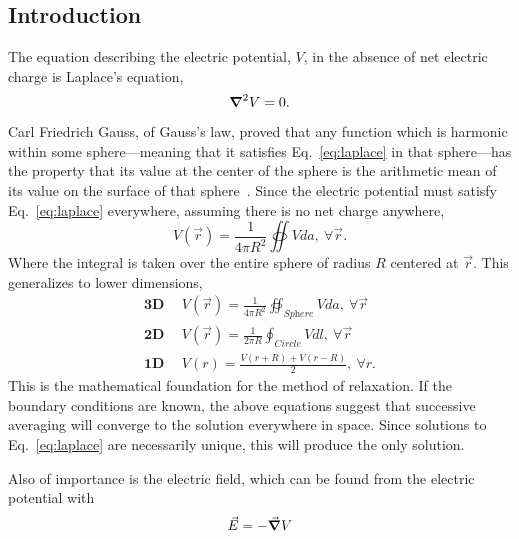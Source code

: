 \documentclass[12pt,twocolumn]{article}
\begin{document}
\subsection{Introduction}
The equation describing the electric potential, $V$, in the absence of net electric charge is Laplace's equation\cite{Jackson99},
\begin{equation}
\grad^2V=0.
\label{eq:laplace}
\end{equation}
Carl Friedrich Gauss, of Gauss's law, proved that any function which is harmonic within some sphere---meaning that it satisfies Eq.~\ref{eq:laplace} in that sphere---has the property that its value at the center of the sphere is the arithmetic mean of its value on the surface of that sphere~\cite{Gauss}. Since the electric potential must satisfy Eq.~\ref{eq:laplace} everywhere, assuming there is no net charge anywhere,
\begin{equation}
V(\vec{r}) = \frac{1}{4\pi R^2}\oiint{Vda},~\forall\vec{r}.
\end{equation}
Where the integral is taken over the entire sphere of radius $R$ centered at $\vec{r}$. This generalizes to lower dimensions,
\begin{align}
\label{eq:3D}\mathrm{\mathbf{3D}}~&~V(\vec{r}) = \frac{1}{4\pi R^2}\oiint_\textit{Sphere}{Vda},~\forall\vec{r}\\
\label{eq:2D}\mathrm{\mathbf{2D}}~&~V(\vec{r}) = \frac{1}{2\pi R}\oint_\textit{Circle}{Vdl},~\forall \vec{r} \\
\label{eq:1D}\mathrm{\mathbf{1D}}~&~V(r) = \frac{V(r+R)+V(r-R)}{2},~\forall r.
\end{align}
This is the mathematical foundation for the method of relaxation. If the boundary conditions are known, the above equations suggest that successive averaging will converge to the solution everywhere in space. Since solutions to Eq.~\ref{eq:laplace} are necessarily unique, this will produce the only solution.

Also of importance is the electric field, which can be found from the electric potential with~\cite{Jackson99}
\begin{equation}
\vec{E}=-\vec{\grad} V
\end{equation}
\end{document}
